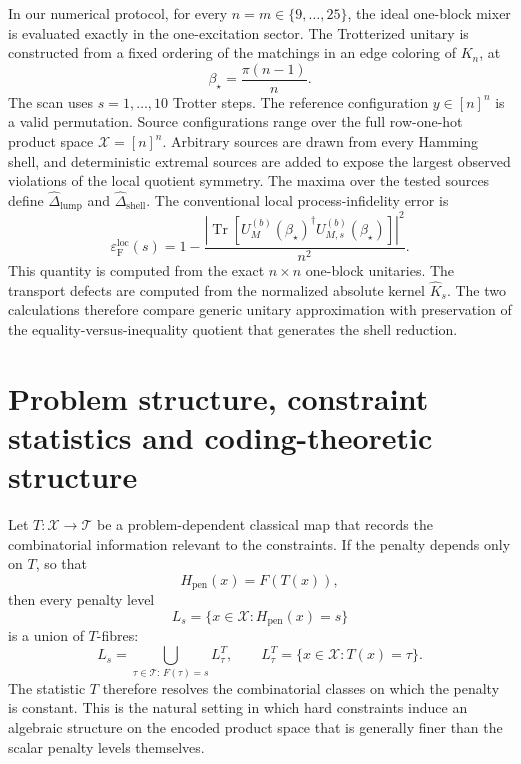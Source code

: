 \documentclass[a4paper,onecolumn,11pt,unpublished]{quantumarticle}
\theoremstyle{remark}
\begin{document}
In our numerical protocol, for every \(n=m\in\{9,\ldots,25\}\), the ideal one-block mixer is evaluated exactly in the one-excitation sector. The Trotterized unitary is constructed from a fixed ordering of the matchings in an edge coloring of \(K_n\), at \[ \beta_\star=\frac{\pi(n-1)}{n}. \] The scan uses \(s=1,\ldots,10\) Trotter steps. The reference configuration \(y\in[n]^n\) is a valid permutation. Source configurations range over the full row-one-hot product space \(\mathcal X=[n]^n\). Arbitrary sources are drawn from every Hamming shell, and deterministic extremal sources are added to expose the largest observed violations of the local quotient symmetry. The maxima over the tested sources define \(\widehat{\Delta}_{\mathrm{lump}}\) and \(\widehat{\Delta}_{\mathrm{shell}}\). The conventional local process-infidelity error is \begin{equation} \varepsilon_{\mathrm{F}}^{\mathrm{loc}}(s) = 1- \frac{ \left| \operatorname{Tr}\!\left[ U_M^{(b)}(\beta_\star)^\dagger U_{M,s}^{(b)}(\beta_\star) \right] \right|^2 }{n^2}. \end{equation} This quantity is computed from the exact \(n\times n\) one-block unitaries. The transport defects are computed from the normalized absolute kernel \(\widehat K_s\). The two calculations therefore compare generic unitary approximation with preservation of the equality-versus-inequality quotient that generates the shell reduction.





\section{Problem structure, constraint statistics and coding-theoretic structure}
\label{app:constraint-statistics-coding}

Let
\(
T:\mathcal X\longrightarrow\mathcal T
\)
be a problem-dependent classical map that records the combinatorial
information relevant to the constraints. If the penalty depends only on
\(T\), so that
\begin{equation}
\label{eq:scheme-alignment-present2}
H_{\mathrm{pen}}(x)=F(T(x)),
\end{equation}
then every penalty level
\[
L_s=\{x\in \mathcal X:H_{\mathrm{pen}}(x)=s\}
\]
is a union of \(T\)-fibres:
\[
L_s
=
\bigcup_{\tau\in\mathcal T:\,F(\tau)=s}
L_\tau^T,
\qquad
L_\tau^T
=
\{x\in \mathcal X:T(x)=\tau\}.
\]
The statistic \(T\) therefore resolves the combinatorial classes on which the
penalty is constant. This is the natural setting in which hard constraints
induce an algebraic structure on the encoded product space that is generally
finer than the scalar penalty levels themselves.
\end{document}
